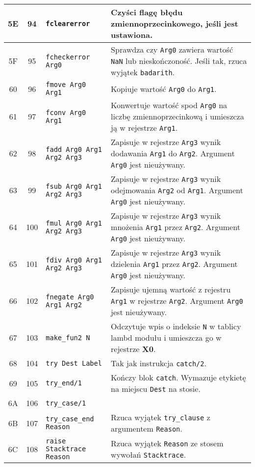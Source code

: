 \begin{longtable}{|c|c|p{5cm}|p{7cm}|}
5E & 94 & \texttt{fclearerror} &  Czyści flagę błędu zmiennoprzecinkowego, jeśli jest ustawiona. \\
\hline
5F & 95 & \texttt{fcheckerror Arg0} &  Sprawdza czy \texttt{Arg0} zawiera wartość \texttt{NaN} lub nieskończoność. Jeśli tak, rzuca wyjątek \texttt{badarith}.\\
\hline
60 & 96 & \texttt{fmove Arg0 Arg1} & Kopiuje wartość \texttt{Arg0} do \texttt{Arg1}. \\
\hline
61 & 97 & \texttt{fconv Arg0 Arg1} & Konwertuje wartość spod \texttt{Arg0} na liczbę zmiennoprzecinkową i umieszcza ją w rejestrze \texttt{Arg1}.\\
\hline
62 & 98 & \texttt{fadd Arg0 Arg1 Arg2 Arg3} & Zapisuje w rejestrze \texttt{Arg3} wynik dodawania \texttt{Arg1} do \texttt{Arg2}. Argument \texttt{Arg0} jest nieużywany. \\
\hline
63 & 99 & \texttt{fsub Arg0 Arg1 Arg2 Arg3} & Zapisuje w rejestrze \texttt{Arg3} wynik odejmowania \texttt{Arg2} od \texttt{Arg1}. Argument \texttt{Arg0} jest nieużywany.\\
\hline
64 & 100 & \texttt{fmul Arg0 Arg1 Arg2 Arg3} & Zapisuje w rejestrze \texttt{Arg3} wynik mnożenia \texttt{Arg1} przez \texttt{Arg2}. Argument \texttt{Arg0} jest nieużywany. \\
\hline
65 & 101 & \texttt{fdiv Arg0 Arg1 Arg2 Arg3} & Zapisuje w rejestrze \texttt{Arg3} wynik dzielenia \texttt{Arg1} przez \texttt{Arg2}. Argument \texttt{Arg0} jest nieużywany. \\
\hline
66 & 102 & \texttt{fnegate Arg0 Arg1 Arg2} & Zapisuje ujemną wartość z rejestru \texttt{Arg1} w rejestrze \texttt{Arg2}. Argument \texttt{Arg0} jest nieużywany.\\
\hline
67 & 103 & \texttt{make\_fun2 N} & Odczytuje wpis o indeksie \texttt{N} w tablicy lambd modułu i umieszcza go w rejestrze \textbf{X0}. \\
\hline
68 & 104 & \texttt{try Dest Label} & Tak jak instrukcja \texttt{catch/2}.  \\
\hline
69 & 105 & \texttt{try\_end/1} & Kończy blok \texttt{catch}. Wymazuje etykietę na miejscu \texttt{Dest} na stosie.\\
\hline
6A & 106 & \texttt{try\_case/1} & \\
\hline
6B & 107 & \texttt{try\_case\_end Reason} &  Rzuca wyjątek \texttt{try\_clause} z argumentem \texttt{Reason}.\\
\hline
6C & 108 & \texttt{raise Stacktrace Reason} & Rzuca wyjątek \texttt{Reason} ze stosem wywołań \texttt{Stacktrace}.\\

\end{longtable}
